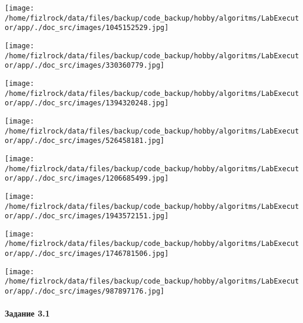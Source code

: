 \documentclass[a4paper, 12pt]{article}
\begin{document}
\texttt{[image: /home/fizlrock/data/files/backup/code\_backup/hobby/algoritms/LabExecutor/app/./doc\_src/images/1045152529.jpg]}

\texttt{[image: /home/fizlrock/data/files/backup/code\_backup/hobby/algoritms/LabExecutor/app/./doc\_src/images/330360779.jpg]}

\texttt{[image: /home/fizlrock/data/files/backup/code\_backup/hobby/algoritms/LabExecutor/app/./doc\_src/images/1394320248.jpg]}

\texttt{[image: /home/fizlrock/data/files/backup/code\_backup/hobby/algoritms/LabExecutor/app/./doc\_src/images/526458181.jpg]}

\texttt{[image: /home/fizlrock/data/files/backup/code\_backup/hobby/algoritms/LabExecutor/app/./doc\_src/images/1206685499.jpg]}

\texttt{[image: /home/fizlrock/data/files/backup/code\_backup/hobby/algoritms/LabExecutor/app/./doc\_src/images/1943572151.jpg]}

\texttt{[image: /home/fizlrock/data/files/backup/code\_backup/hobby/algoritms/LabExecutor/app/./doc\_src/images/1746781506.jpg]}

\texttt{[image: /home/fizlrock/data/files/backup/code\_backup/hobby/algoritms/LabExecutor/app/./doc\_src/images/987897176.jpg]}
\pagebreak
\paragraph{Задание 3.1}
\end{document}

